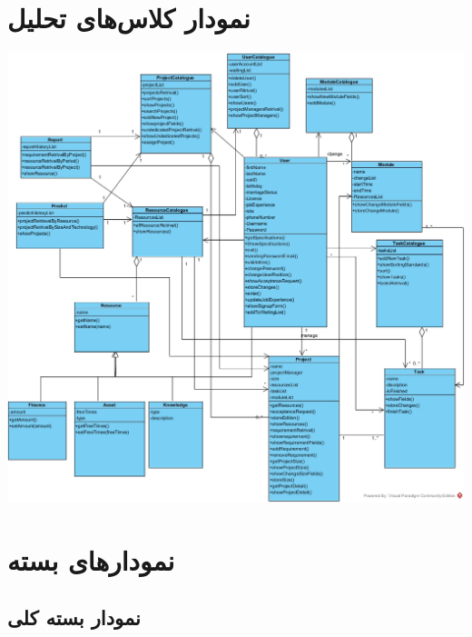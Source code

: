 \newpage
\section{نمودار کلاس‌های تحلیل}

\vspace{2cm}
\begin{center}
\includegraphics[width=\textwidth]{PackageDiagram/ClassDiagram.jpg}
\end{center}



\newpage
\section{نمودارهای بسته}

\vspace{1cm}
\subsection{نمودار بسته کلی}

